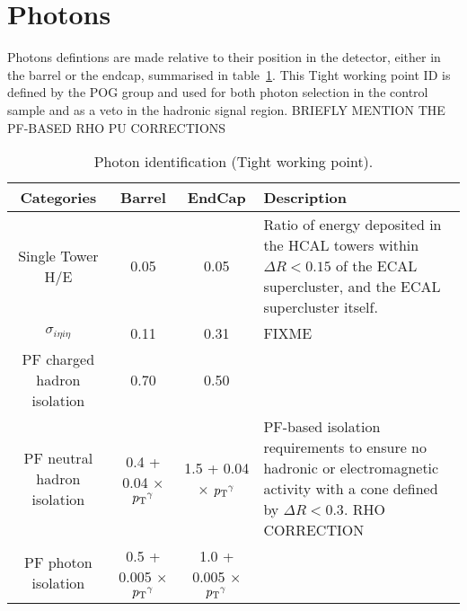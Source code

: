 \section{Photons}  %
\label{sec:objects_photons}

Photons defintions are made relative to their position in the detector, either 
in the barrel or the endcap, summarised in table~\ref{tab:photon-id-egamma}. 
This Tight working point ID is defined by the POG group and used for both photon
selection in the \gj control sample and as a veto in the hadronic signal region.
BRIEFLY MENTION THE PF-BASED RHO PU CORRECTIONS

\begin{table}[ht!]
  \caption{Photon identification (Tight working point).\label{tab:photon-id-egamma}}
  \centering
  \footnotesize
  \begin{tabular}{ cccp{4cm} }
    \hline
    \hline
    Categories                    & Barrel                             & EndCap 
    & Description                         \\
    \hline
    Single Tower H/E              & 0.05                               & 0.05                               
    & Ratio of energy deposited in the HCAL towers within $\Delta R<0.15$ of the ECAL 
    supercluster, and the ECAL supercluster itself. \\
    $\sigma_{i\eta i\eta}$        & 0.11                               & 0.31 & 
    FIXME \\
    PF charged hadron isolation   & 0.70                               & 0.50                               & \\
    PF neutral hadron isolation   & 0.4 + 0.04 $\times$ ${p_{\text T}}^{\gamma}$  & 1.5 + 0.04 $\times$ ${p_{\text T}}^{\gamma}$&
    PF-based isolation requirements to ensure no hadronic or electromagnetic 
    activity with a cone defined by $\Delta R < 0.3$. RHO CORRECTION    \\
    PF photon isolation           & 0.5 + 0.005 $\times$ ${p_{\text T}}^{\gamma}$ & 1.0 + 0.005 $\times$ ${p_{\text T}}^{\gamma}$& \\
    \hline
    \hline
  \end{tabular}
\end{table}

